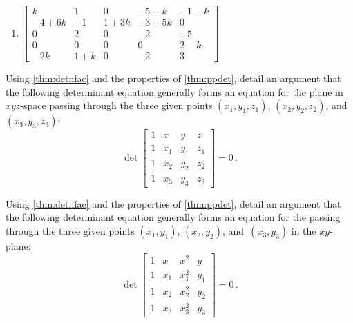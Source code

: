 \begin{exercise}
\begin{enumerate}
\item \(\begin{bmatrix} k & 1 & 0 & -5-k & -1-k
\\-4+6k & -1 & 1+3k & -3-5k & 0
\\0 & 2 & 0 & -2 & -5
\\0 & 0 & 0 & 0 & 2-k
\\-2k & 1+k & 0 & -2 & 3 \end{bmatrix}\)

\end{enumerate}
\end{exercise}






\begin{exercise}  
Using \cref{thm:detnfac} and the properties of \cref{thm:ppdet}, detail an argument that the following determinant equation generally forms an equation for the plane in \(xyz\)-space passing through the three given points \((x_1,y_1,z_1)\), \((x_2,y_2,z_2)\), and~\((x_3,y_3,z_3)\):
\begin{equation*}
\det\begin{bmatrix} 1&x&y&z
\\1&x_1&y_1&z_1
\\1&x_2&y_2&z_2
\\1&x_3&y_3&z_3 \end{bmatrix}=0\,.
\end{equation*}

\end{exercise}



\begin{exercise}  
Using \cref{thm:detnfac} and the properties of \cref{thm:ppdet}, detail an argument that the following determinant equation generally forms an equation for the  passing through the three given points \((x_1,y_1)\), \((x_2,y_2)\), and~\((x_3,y_3)\) in the \(xy\)-plane:
\begin{equation*}
\det\begin{bmatrix} 1&x&x^2&y
\\1&x_1&x_1^2&y_1
\\1&x_2&x_2^2&y_2
\\1&x_3&x_3^2&y_3 \end{bmatrix}=0\,.
\end{equation*}
\end{exercise}






